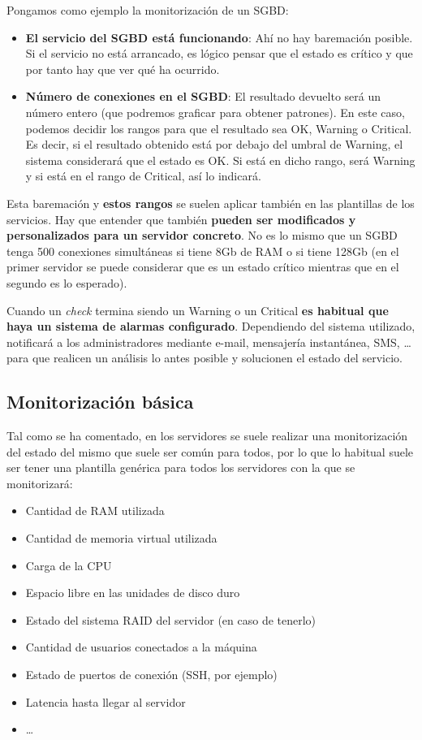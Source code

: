 Pongamos como ejemplo la monitorización de un SGBD:
\begin{itemize}
    \item \textbf{El servicio del SGBD está funcionando}: Ahí no hay baremación posible. Si el servicio no está arrancado, es lógico pensar que el estado es crítico y que por tanto hay que ver qué ha ocurrido.
    \item \textbf{Número de conexiones en el SGBD}:  El resultado devuelto será un número entero (que podremos graficar para obtener patrones). En este caso, podemos decidir los rangos para que el resultado sea OK, Warning o Critical. Es decir, si el resultado obtenido está por debajo del umbral de Warning, el sistema considerará que el estado es OK. Si está en dicho rango, será Warning y si está en el rango de Critical, así lo indicará.
\end{itemize}

Esta baremación y \textbf{estos rangos} se suelen aplicar también en las plantillas de los servicios. Hay que entender que también \textbf{pueden ser modificados y personalizados para un servidor concreto}. No es lo mismo que un SGBD tenga 500 conexiones simultáneas si tiene 8Gb de RAM o si tiene 128Gb (en el primer servidor se puede considerar que es un estado crítico mientras que en el segundo es lo esperado).

Cuando un \textit{check} termina siendo un Warning o un Critical \textbf{es habitual que haya un sistema de alarmas configurado}. Dependiendo del sistema utilizado, notificará a los administradores mediante e-mail, mensajería instantánea, SMS, … para que realicen un análisis lo antes posible y solucionen el estado del servicio.



\subsection{Monitorización básica}
Tal como se ha comentado, en los servidores se suele realizar una monitorización del estado del mismo que suele ser común para todos, por lo que lo habitual suele ser tener una plantilla genérica para todos los servidores con la que se monitorizará:
\begin{itemize}
    \item Cantidad de RAM utilizada
    \item Cantidad de memoria virtual utilizada
    \item Carga de la CPU
    \item Espacio libre en las unidades de disco duro
    \item Estado del sistema RAID del servidor (en caso de tenerlo)
    \item Cantidad de usuarios conectados a la máquina
    \item Estado de puertos de conexión (SSH, por ejemplo)
    \item Latencia hasta llegar al servidor
    \item …
\end{itemize}

